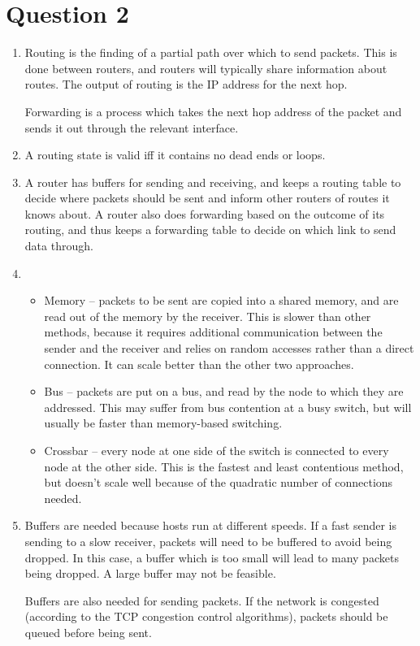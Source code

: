 \documentclass{article}
\begin{document}
\section*{Question 2}
\begin{enumerate}
  \item
    Routing is the finding of a partial path over which to send packets. This is done between routers, and routers will typically share information about routes. The output of routing is the IP address for the next hop.

    Forwarding is a process which takes the next hop address of the packet and sends it out through the relevant interface.
  \item A routing state is valid iff it contains no dead ends or loops.
  \item A router has buffers for sending and receiving, and keeps a routing table to decide where packets should be sent and inform other routers of routes it knows about. A router also does forwarding based on the outcome of its routing, and thus keeps a forwarding table to decide on which link to send data through.
  \item
    \begin{itemize}
      \item Memory -- packets to be sent are copied into a shared memory, and are read out of the memory by the receiver. This is slower than other methods, because it requires additional communication between the sender and the receiver and relies on random accesses rather than a direct connection. It can scale better than the other two approaches.
      \item Bus -- packets are put on a bus, and read by the node to which they are addressed. This may suffer from bus contention at a busy switch, but will usually be faster than memory-based switching.
      \item Crossbar -- every node at one side of the switch is connected to every node at the other side. This is the fastest and least contentious method, but doesn't scale well because of the quadratic number of connections needed.
    \end{itemize}
  \item Buffers are needed because hosts run at different speeds. If a fast sender is sending to a slow receiver, packets will need to be buffered to avoid being dropped. In this case, a buffer which is too small will lead to many packets being dropped. A large buffer may not be feasible.

    Buffers are also needed for sending packets. If the network is congested (according to the TCP congestion control algorithms), packets should be queued before being sent.
\end{enumerate}
\end{document}
